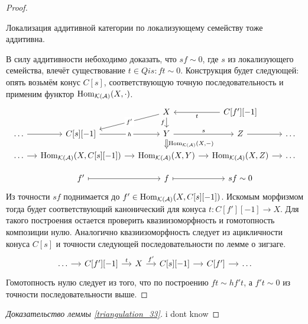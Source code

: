 \documentclass[../main.tex]{subfiles}
\begin{document}
\begin{proof}
\begin{to_lem}
Локализация аддитивной категории по локализующему семейству тоже аддитивна.
\end{to_lem}
В силу аддитивности небоходимо доказать, что $sf\sim 0$, где $s$ из локализующего семейства, влечёт существование $t\in Qis: ft\sim 0$.
Конструкция будет следующей: опять возьмём конус $C[s]$, соответствующую точную последовательность и применим функтор $\operatorname{Hom}_{\mathcal{K}(\mathcal{A})}(X, \cdot)$.
    \begin{equation*}
        \begin{tikzcd}[sep=small]
	&& X&C[f'][-1] \\
	\ldots & {C[s][-1]} & Y & Z & \ldots \\
	\ldots & {\Hom_{\mathcal{K}(\mathcal{A})}(X, C[s][-1])} & {\Hom_{\mathcal{K}(\mathcal{A})}(X, Y)} & {\Hom_{\mathcal{K}(\mathcal{A})}(X, Z)} & \ldots \\
	& {f'} & f & {sf\sim 0}
    \arrow[from=1-4, to=1-3, "t"]
	\arrow["h"{description}, from=2-2, to=2-3]
	\arrow["s", from=2-3, to=2-4]
	\arrow[from=2-4, to=2-5]
	\arrow[from=2-1, to=2-2]
	\arrow["{\Hom_{\mathcal{K}(\mathcal{A})}(X, -)}", Rightarrow, from=2-3, to=3-3]
	\arrow[from=3-2, to=3-3]
	\arrow[from=3-1, to=3-2]
	\arrow[from=3-3, to=3-4]
	\arrow[from=3-4, to=3-5]
	\arrow["f"', from=1-3, to=2-3]
	\arrow[maps to, from=4-3, to=4-4]
	\arrow[maps to, from=4-2, to=4-3]
    \arrow[from=1-3, to=2-2, "f'"{description}]
\end{tikzcd}
    \end{equation*}
Из точности $sf$ поднимается до $f'\in \operatorname{Hom}_{\mathcal{K}(\mathcal{A})}(X, C[s][-1])$. Искомым морфизмом тогда будет соответствующий канонический для конуса $t:C[f'][-1]\to X$.
Для такого построения остается проверить квазиизоморфность и гомотопность композиции нулю. Аналогично квазиизоморфность следует из ацикличности конуса $C[s]$ и точности следующей последовательности по лемме о зигзаге.
\begin{equation*}
    \begin{tikzcd}[sep=small]
	\ldots & {C[f'][-1]} & X & {C[s][-1]} & {C[f']} & \ldots
	\arrow["t", from=1-2, to=1-3]
	\arrow["f'", from=1-3, to=1-4]
	\arrow[from=1-4, to=1-5]
	\arrow[from=1-5, to=1-6]
	\arrow[from=1-1, to=1-2]
\end{tikzcd}
\end{equation*}
Гомотопность нулю следует из того, что по построению $ft\sim hf't$, а $f't\sim 0$ из точности последовательности выше.
\end{proof}
\begin{proof}[Доказательство леммы \ref{triangulation_33}]
    i dont know
\end{proof}
\end{document}
